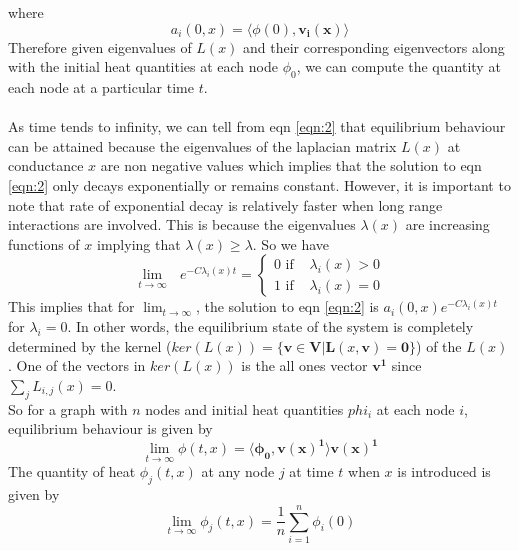 \documentclass[10pt,a4paper]{article}
\begin{document}
where\\
\begin{equation*}
a_{i}(0,x) = \langle \phi(0), \mathbf{v_{i}(x)}\rangle
\end{equation*}
Therefore given eigenvalues of $L(x)$ and their corresponding eigenvectors along with the initial heat quantities at each node $\phi_0$, we can compute the quantity at each node at a particular time $t$.\\\\
As time tends to infinity, we  can tell from eqn \ref{eqn:2} that equilibrium behaviour can be attained because the eigenvalues of the laplacian matrix $L(x)$ at conductance $x$ are non negative values which implies that the solution to eqn \ref{eqn:2} only decays exponentially or remains constant. However, it is important to note that rate of exponential decay is relatively faster when long range interactions are involved. This is because the eigenvalues $\lambda(x)$ are increasing functions of $x$ implying that $\lambda(x) \geq \lambda$. So we have
\begin{equation*}
\lim_{t \longrightarrow \infty}\text{ } e^{-C \lambda_{i}(x) t} = 
\begin{cases} 
0 \text{ if } & \lambda_{i}(x) > 0\\
1 \text{ if } & \lambda_{i}(x) = 0
\end{cases}
\end{equation*}
This implies that for $\lim_{t \longrightarrow \infty}$, the solution to eqn \ref{eqn:2} is  $a_{i}(0,x) e^{-C \lambda_{i}(x) t}$ for $\lambda_{i}=0$.
In other words, the equilibrium state of the system is completely determined by the kernel ($ker(L(x))= \{ \mathbf{v} \in \mathbf{V} | \mathbf{L}(x,\mathbf{v}) = \mathbf{0} \}$) of the $L(x)$. One of the vectors in $ker(L(x))$ is the all ones vector $\mathbf{v^1}$ since $\sum_j L_{i,j} (x) = 0$.\\
So for a graph with $n$ nodes and initial heat quantities  $phi_i$ at each node $i$, equilibrium behaviour is given by
\begin{equation*}
\lim_{t \longrightarrow \infty} \phi(t,x) = \langle \mathbf{\phi_0}, \mathbf{v(x) ^1}\rangle \mathbf{v(x)^1}
\end{equation*}
The quantity of heat $\phi_{j} (t,x)$ at any node $j$ at time $t$ when $x$ is introduced is given by\\
\begin{equation*}
\lim_{t \longrightarrow \infty} \phi_{j}(t,x) = \frac{1}{n} \sum_{i=1}^{n} \phi_{i} (0)
\end{equation*}
\end{document}

